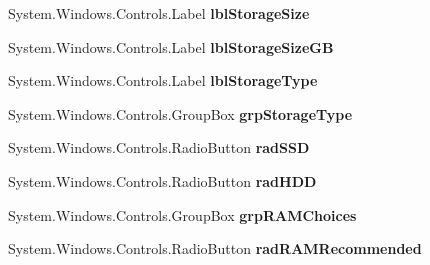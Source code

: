 \begin{DoxyCompactItemize}
\item 
System.\+Windows.\+Controls.\+Label {\bfseries lbl\+Storage\+Size}\hypertarget{class_p_c_builder_forms_1_1_questionnaire_a64334da3c950cbe2c1d69e132987da9f}{}\label{class_p_c_builder_forms_1_1_questionnaire_a64334da3c950cbe2c1d69e132987da9f}

\item 
System.\+Windows.\+Controls.\+Label {\bfseries lbl\+Storage\+Size\+GB}\hypertarget{class_p_c_builder_forms_1_1_questionnaire_a7b0d0ecbfbc74b6d565a42bb4141fbf4}{}\label{class_p_c_builder_forms_1_1_questionnaire_a7b0d0ecbfbc74b6d565a42bb4141fbf4}

\item 
System.\+Windows.\+Controls.\+Label {\bfseries lbl\+Storage\+Type}\hypertarget{class_p_c_builder_forms_1_1_questionnaire_a7f8e282593378445f3e6454297928f0c}{}\label{class_p_c_builder_forms_1_1_questionnaire_a7f8e282593378445f3e6454297928f0c}

\item 
System.\+Windows.\+Controls.\+Group\+Box {\bfseries grp\+Storage\+Type}\hypertarget{class_p_c_builder_forms_1_1_questionnaire_aacb718674bd68956728ca4e7d4f24f20}{}\label{class_p_c_builder_forms_1_1_questionnaire_aacb718674bd68956728ca4e7d4f24f20}

\item 
System.\+Windows.\+Controls.\+Radio\+Button {\bfseries rad\+S\+SD}\hypertarget{class_p_c_builder_forms_1_1_questionnaire_abaaba55fd7be22a9e7dd881a411ad074}{}\label{class_p_c_builder_forms_1_1_questionnaire_abaaba55fd7be22a9e7dd881a411ad074}

\item 
System.\+Windows.\+Controls.\+Radio\+Button {\bfseries rad\+H\+DD}\hypertarget{class_p_c_builder_forms_1_1_questionnaire_a50611bac3cc1a32bf7cd7cab900d19f4}{}\label{class_p_c_builder_forms_1_1_questionnaire_a50611bac3cc1a32bf7cd7cab900d19f4}

\item 
System.\+Windows.\+Controls.\+Group\+Box {\bfseries grp\+R\+A\+M\+Choices}\hypertarget{class_p_c_builder_forms_1_1_questionnaire_adf88f1d08662bc0b93ba36ae5d6e3cd7}{}\label{class_p_c_builder_forms_1_1_questionnaire_adf88f1d08662bc0b93ba36ae5d6e3cd7}

\item 
System.\+Windows.\+Controls.\+Radio\+Button {\bfseries rad\+R\+A\+M\+Recommended}\hypertarget{class_p_c_builder_forms_1_1_questionnaire_a9667e48b87ba5ca17958376e62f85bfc}{}\label{class_p_c_builder_forms_1_1_questionnaire_a9667e48b87ba5ca17958376e62f85bfc}


\end{DoxyCompactItemize}
